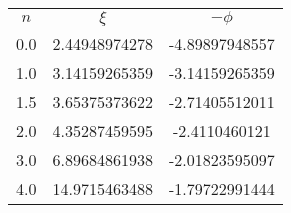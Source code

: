 \begin{table}
\begin{tabular}{ccc}
$n$ & $\xi$ & $-\phi$ \\
0.0 & 2.44948974278 & -4.89897948557 \\
1.0 & 3.14159265359 & -3.14159265359 \\
1.5 & 3.65375373622 & -2.71405512011 \\
2.0 & 4.35287459595 & -2.4110460121 \\
3.0 & 6.89684861938 & -2.01823595097 \\
4.0 & 14.9715463488 & -1.79722991444 \\
\end{tabular}
\end{table}
